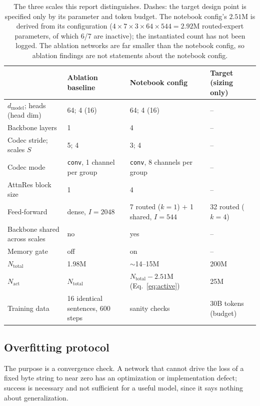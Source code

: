 \documentclass[11pt]{article}
\begin{document}
\begin{table}[t]
\centering
\small
\begin{tabular}{@{}lp{3.4cm}p{3.9cm}p{2.6cm}@{}}
\toprule
 & Ablation baseline & Notebook config & Target (sizing only) \\
\midrule
$d_{\text{model}}$; heads (head dim) & 64; 4 (16) & 64; 4 (16) & -- \\
Backbone layers & 1 & 4 & -- \\
Codec stride; scales $S$ & 5; 4 & 3; 4 & -- \\
Codec mode & \texttt{conv}, 1 channel per group & \texttt{conv}, 8 channels per group & -- \\
AttnRes block size & 1 & 4 & -- \\
Feed-forward & dense, $I=2048$ & 7 routed ($k=1$) $+$ 1 shared, $I=544$ & 32 routed ($k=4$) \\
Backbone shared across scales & no & yes & -- \\
Memory gate & off & on & -- \\
$N_{\text{total}}$ & 1.98M & $\sim$14--15M & 200M \\
$N_{\text{act}}$ & $N_{\text{total}}$ & $N_{\text{total}}-2.51$M (Eq.~\ref{eq:active}) & 25M \\
Training data & 16 identical sentences, 600 steps & sanity checks & 30B tokens (budget) \\
\bottomrule
\end{tabular}
\caption{The three scales this report distinguishes. Dashes: the target
design point is specified only by its parameter and token budget. The notebook config's
$2.51$M is derived from its configuration
($4\times7\times3\times64\times544=2.92$M routed-expert parameters, of which
6/7 are inactive); the instantiated count has not been logged. The ablation
networks are far smaller than the notebook config, so ablation findings are not
statements about the notebook config.}
\label{tab:configs}
\end{table}



\subsection{Overfitting protocol}
\label{sec:protocol}

The purpose is a convergence check. A network that cannot drive the loss of a fixed
byte string to near zero has an optimization or implementation defect; success is necessary
and not sufficient for a useful model, since it says nothing about generalization.
\end{document}
